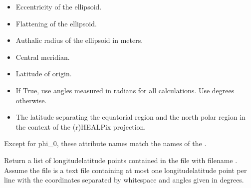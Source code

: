 \documentclass[a4paper,12ptopenany,oneside,english]{sphinxmanual}
\begin{document}
\begin{fulllineitems}
\begin{itemize}
\item {} 
\sphinxAtStartPar
{} \sphinxhyphen{} Eccentricity of the ellipsoid.

\item {} 
\sphinxAtStartPar
{} \sphinxhyphen{} Flattening of the ellipsoid.

\item {} 
\sphinxAtStartPar
{} \sphinxhyphen{} Authalic radius of the ellipsoid in meters.

\item {} 
\sphinxAtStartPar
{} \sphinxhyphen{} Central meridian.

\item {} 
\sphinxAtStartPar
{} \sphinxhyphen{} Latitude of origin.

\item {} 
\sphinxAtStartPar
{} \sphinxhyphen{} If True, use angles measured in radians for all calculations.
Use degrees otherwise.

\item {} 
\sphinxAtStartPar
{} \sphinxhyphen{} The latitude separating the equatorial region and
the north polar region in the context of the (r)HEALPix projection.

\end{itemize}

\sphinxAtStartPar
Except for phi\_0, these attribute names match the names of the
.

\begin{fulllineitems}
\label{\detokenize{ellipsoids:rhealpixdggs.ellipsoids.Ellipsoid.get_points}}
\pysigstartsignatures
{}
\pysigstopsignatures
\sphinxAtStartPar
Return a list of longitude\sphinxhyphen{}latitude points contained in
the file with filename .
Assume the file is a text file containing at most one
longitude\sphinxhyphen{}latitude point per line with the coordinates separated by
whitespace and angles given in degrees.

\end{fulllineitems}



\end{fulllineitems}
\end{document}
